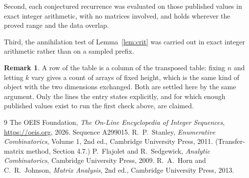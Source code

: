 \documentclass[11pt,a4paper]{article}
\theoremstyle{plain}
\theoremstyle{definition}
\newtheorem{remark}[theorem]{Remark}
\begin{document}
Second, each conjectured recurrence was evaluated on those published values in exact
integer arithmetic, with no matrices involved, and holds wherever the proved range and the
data overlap.

Third, the annihilation test of Lemma~\ref{lem:crit} was carried out in exact integer
arithmetic rather than on a sampled prefix.

\begin{remark}
A row of the table is a column of the transposed table: fixing $n$ and letting $k$ vary gives a
count of arrays of fixed height, which is the same kind of object with the two dimensions
exchanged. Both are settled here by the same argument. Only the lines the entry states
explicitly, and for which enough published values exist to run the first check above, are
claimed.
\end{remark}

\begin{thebibliography}{9}
 The OEIS Foundation, \emph{The On-Line Encyclopedia of Integer
Sequences}, \url{https://oeis.org}, 2026. Sequence A299015.
 R.~P.~Stanley, \emph{Enumerative Combinatorics}, Volume 1, 2nd ed.,
Cambridge University Press, 2011. (Transfer-matrix method, Section 4.7.)
 P.~Flajolet and R.~Sedgewick, \emph{Analytic Combinatorics}, Cambridge
University Press, 2009.
 R.~A.~Horn and C.~R.~Johnson, \emph{Matrix Analysis}, 2nd ed., Cambridge
University Press, 2013.
\end{thebibliography}
\end{document}
